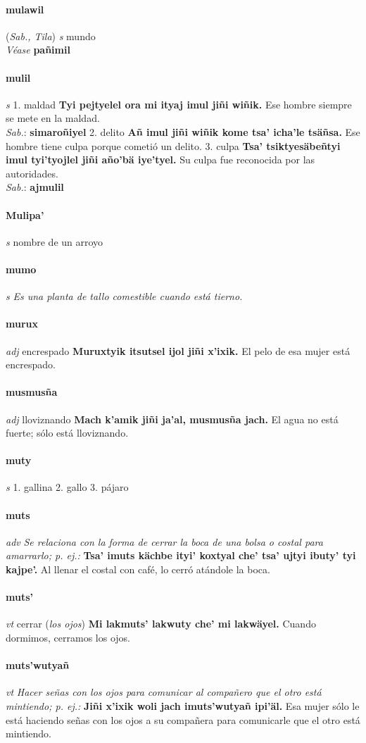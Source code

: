 \documentclass{scrbook}
\newcommand{\entry}[1]{\paragraph{#1}}
\newcommand{\onedefinition}[1]{#1.}
\newcommand{\nontranslationdef}[1]{\textit{#1}}
\newcommand{\partofspeech}[1]{\textit{#1}}
\newcommand{\spanishtranslation}[1]{#1}
\newcommand{\clarification}[1]{(\textit{#1})}
\newcommand{\cholexample}[1]{\textbf{#1}}
\newcommand{\exampletranslation}[1]{#1}
\newcommand{\dialectvariant}[1]{\\\textit{#1}:}
\newcommand{\dialectword}[1]{\textbf{#1}}
\newcommand{\alsosee}[1]{\\\textit{Véase} \textbf{#1}}
\newcommand{\relevantdialect}[1]{(\textit{#1})}
\begin{document}
\begin{multicols}{2}
\entry{mulawil}
\relevantdialect{Sab., Tila}
\partofspeech{s}
\spanishtranslation{mundo}
\alsosee{pañimil}

\entry{mulil}
\partofspeech{s}
\onedefinition{1}
\spanishtranslation{maldad}
\cholexample{Tyi pejtyelel ora mi ityaj imul jiñi wiñik.}
\exampletranslation{Ese hombre siempre se mete en la maldad.}
\dialectvariant{Sab.}
\dialectword{simaroñiyel}
\onedefinition{2}
\spanishtranslation{delito}
\cholexample{Añ imul jiñi wiñik kome tsa' icha'le tsäñsa.}
\exampletranslation{Ese hombre tiene culpa porque cometió un delito.}
\onedefinition{3}
\spanishtranslation{culpa}
\cholexample{Tsa' tsiktyesäbeñtyi imul tyi'tyojlel jiñi año'bä iye'tyel.}
\exampletranslation{Su culpa fue reconocida por las autoridades.}
\dialectvariant{Sab.}
\dialectword{ajmulil}

\entry{Mulipa'}
\partofspeech{s}
\spanishtranslation{nombre de un arroyo}

\entry{mumo}
\partofspeech{s}
\nontranslationdef{Es una planta de tallo comestible cuando está tierno.}

\entry{murux}
\partofspeech{adj}
\spanishtranslation{encrespado}
\cholexample{Muruxtyik itsutsel ijol jiñi x'ixik.}
\exampletranslation{El pelo de esa mujer está encrespado.}

\entry{musmusña}
\partofspeech{adj}
\spanishtranslation{lloviznando}
\cholexample{Mach k'amik jiñi ja'al, musmusña jach.}
\exampletranslation{El agua no está fuerte; sólo está lloviznando.}

\entry{muty}
\partofspeech{s}
\onedefinition{1}
\spanishtranslation{gallina}
\onedefinition{2}
\spanishtranslation{gallo}
\onedefinition{3}
\spanishtranslation{pájaro}

\entry{muts}
\partofspeech{adv}
\nontranslationdef{Se relaciona con la forma de cerrar la boca de una bolsa o costal para amarrarlo; p. ej.:}
\cholexample{Tsa' imuts kächbe ityi' koxtyal che' tsa' ujtyi ibuty' tyi kajpe'.}
\exampletranslation{Al llenar el costal con café, lo cerró atándole la boca.}

\entry{muts'}
\partofspeech{vt}
\spanishtranslation{cerrar}
\clarification{los ojos}
\cholexample{Mi lakmuts' lakwuty che' mi lakwäyel.}
\exampletranslation{Cuando dormimos, cerramos los ojos.}

\entry{muts'wutyañ}
\partofspeech{vt}
\nontranslationdef{Hacer señas con los ojos para comunicar al compañero que el otro está mintiendo; p. ej.:}
\cholexample{Jiñi x'ixik woli jach imuts'wutyañ ipi'äl.}
\exampletranslation{Esa mujer sólo le está haciendo señas con los ojos a su compañera para comunicarle que el otro está mintiendo.}


\end{multicols}
\end{document}
